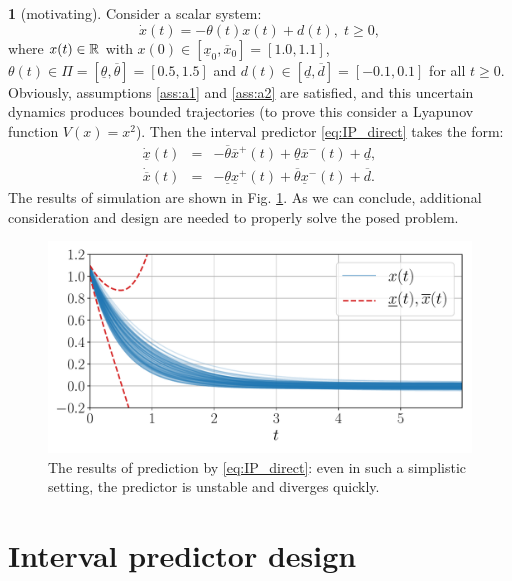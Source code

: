 \documentclass[letterpaper, 10 pt, conference]{ieeeconf}
\theoremstyle{plain}
\theoremstyle{definition}
\newtheorem*{example*}{\protect\examplename}
\theoremstyle{plain}
\theoremstyle{plain}
\theoremstyle{remark}
\providecommand{\examplename}{Example}
\begin{document}
\begin{example*}
[motivating] Consider a scalar system:
\[
\dot{x}(t)=-\theta(t)x(t)+d(t),\;t\geq0,
\]
where $x(t)\in\mathbb{R}$ with $x(0)\in[\underline{x}_{0},\overline{x}_{0}]=[1.0, 1.1]$, $\theta(t)\in\Pi=[\underline{\theta},\overline{\theta}]=[0.5,1.5]$ and $d(t)\in[\underline{d},\overline{d}]=[-0.1,0.1]$ for all $t\geq0$. Obviously, assumptions \ref{ass:a1} and \ref{ass:a2} are satisfied, and this uncertain dynamics produces bounded trajectories (to prove this consider a Lyapunov function $V(x)=x^{2}$). Then the interval predictor \eqref{eq:IP_direct} takes the form:
\begin{eqnarray*}
\dot{\underline{x}}(t) & = & -\overline{\theta}\overline{x}^{+}(t)+\underline{\theta}\overline{x}^{-}(t)+\underline{d},\\
\dot{\overline{x}}(t) & = & -\underline{\theta}\underline{x}^{+}(t)+\overline{\theta}\underline{x}^{-}(t)+\overline{d}.
\end{eqnarray*}
The results of simulation are shown in Fig. \ref{fig:IP_Direct}. As we can conclude, additional consideration and design are needed to properly solve the posed problem.
\begin{figure}
\begin{centering}
\includegraphics[width=\linewidth]{observer}
\par\end{centering}
\caption{\label{fig:IP_Direct} The results of prediction by \eqref{eq:IP_direct}: even in such a simplistic setting, the predictor is unstable and diverges quickly.}
\end{figure}
\end{example*}

\section{\label{sec:Main-results} Interval predictor design}
\end{document}
